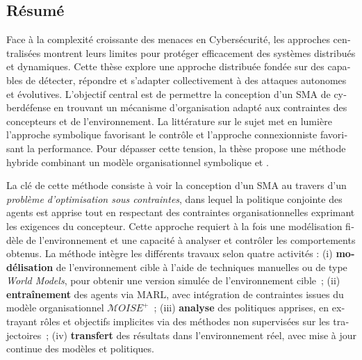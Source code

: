 \renewcommand{\abstractname}{Abstract}
\begingroup
\let\clearpage\relax
\let\cleardoublepage\relax
\let\cleardoublepage\relax

\begin{otherlanguage}{ngerman}
    \chapter*{Résumé}

    Face à la complexité croissante des menaces en Cybersécurité, les approches centralisées montrent leurs limites pour protéger efficacement des systèmes distribués et dynamiques. Cette thèse explore une approche distribuée fondée sur des  capables de détecter, répondre et s'adapter collectivement à des attaques autonomes et évolutives.
    L'objectif central est de permettre la conception d'un SMA de cyberdéfense en trouvant un mécanisme d'organisation adapté aux contraintes des concepteurs et de l'environnement. La littérature sur le sujet met en lumière l'approche symbolique favorisant le contrôle et l'approche connexionniste favorisant la performance. Pour dépasser cette tension, la thèse propose une méthode hybride combinant un modèle organisationnel symbolique et .

    La clé de cette méthode consiste à voir la conception d'un SMA au travers d'un \textit{problème d'optimisation sous contraintes}, dans lequel la politique conjointe des agents est apprise tout en respectant des contraintes organisationnelles exprimant les exigences du concepteur. Cette approche requiert à la fois une modélisation fidèle de l'environn\-ement et une capacité à analyser et contrôler les comportements obtenus.
    La méthode intègre les différents travaux selon quatre activités : (i) \textbf{modélisation} de l'environnement cible à l'aide de techniques manuelles ou de type \textit{World Models}, pour obtenir une version simulée de l'environnement cible~; (ii) \textbf{entraînement} des agents via MARL, avec intégration de contraintes issues du modèle organisationnel $\mathcal{M}OISE^+$~; (iii) \textbf{analyse} des politiques apprises, en extrayant rôles et objectifs implicites via des méthodes non supervisées sur les trajectoires~; (iv) \textbf{transfert} des résultats dans l'environnement réel, avec mise à jour continue des modèles et politiques.


\end{otherlanguage}
